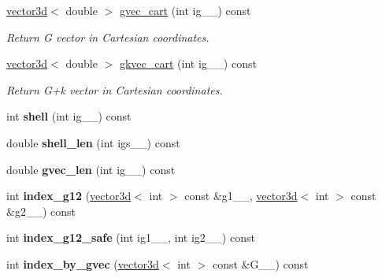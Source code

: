 \begin{DoxyCompactItemize}
\hyperlink{classgeometry3d_1_1vector3d}{vector3d}$<$ double $>$ \hyperlink{classsddk_1_1_gvec_a6feee2cf2bb69c332da123b998d676b1}{gvec\+\_\+cart} (int ig\+\_\+\+\_\+) const 
\begin{DoxyCompactList}\small\item\em Return G vector in Cartesian coordinates. \end{DoxyCompactList}\item 
\hyperlink{classgeometry3d_1_1vector3d}{vector3d}$<$ double $>$ \hyperlink{classsddk_1_1_gvec_a554db08f50c3aa36248bb903a84cd0df}{gkvec\+\_\+cart} (int ig\+\_\+\+\_\+) const 
\begin{DoxyCompactList}\small\item\em Return G+k vector in Cartesian coordinates. \end{DoxyCompactList}\item 
\hypertarget{classsddk_1_1_gvec_a2dc83610ddefc0035bdabf07bc55f906}{}int {\bfseries shell} (int ig\+\_\+\+\_\+) const \label{classsddk_1_1_gvec_a2dc83610ddefc0035bdabf07bc55f906}

\item 
\hypertarget{classsddk_1_1_gvec_afae1b3adb0b413b3dc50ec282563cc5f}{}double {\bfseries shell\+\_\+len} (int igs\+\_\+\+\_\+) const \label{classsddk_1_1_gvec_afae1b3adb0b413b3dc50ec282563cc5f}

\item 
\hypertarget{classsddk_1_1_gvec_ac127b0edcf125c98814d257f2a584f75}{}double {\bfseries gvec\+\_\+len} (int ig\+\_\+\+\_\+) const \label{classsddk_1_1_gvec_ac127b0edcf125c98814d257f2a584f75}

\item 
\hypertarget{classsddk_1_1_gvec_a7db4c052b6d03c52862fddef3b18be2c}{}int {\bfseries index\+\_\+g12} (\hyperlink{classgeometry3d_1_1vector3d}{vector3d}$<$ int $>$ const \&g1\+\_\+\+\_\+, \hyperlink{classgeometry3d_1_1vector3d}{vector3d}$<$ int $>$ const \&g2\+\_\+\+\_\+) const \label{classsddk_1_1_gvec_a7db4c052b6d03c52862fddef3b18be2c}

\item 
\hypertarget{classsddk_1_1_gvec_a04b03e506a21aa933769b84225824556}{}int {\bfseries index\+\_\+g12\+\_\+safe} (int ig1\+\_\+\+\_\+, int ig2\+\_\+\+\_\+) const \label{classsddk_1_1_gvec_a04b03e506a21aa933769b84225824556}

\item 
\hypertarget{classsddk_1_1_gvec_af2ce06b5c36d67987c9555a2d9f5f2ec}{}int {\bfseries index\+\_\+by\+\_\+gvec} (\hyperlink{classgeometry3d_1_1vector3d}{vector3d}$<$ int $>$ const \&G\+\_\+\+\_\+) const \label{classsddk_1_1_gvec_af2ce06b5c36d67987c9555a2d9f5f2ec}


\end{DoxyCompactItemize}

